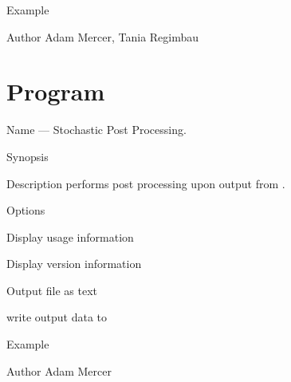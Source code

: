 \begin{entry}
\item[Example]

\item[Author] 
Adam Mercer, Tania Regimbau
\end{entry}
\clearpage

\clearpage
\section{Program }
\label{program:lalapps-stopp}

\begin{entry}
\item[Name]
 --- Stochastic Post Processing.

\item[Synopsis]
  \newline \hspace*{0.5in}
 \newline \hspace*{0.5in}
 \newline \hspace*{0.5in}
 \newline \hspace*{0.5in}
 

\item[Description]  performs post processing upon
output from .

\item[Options]\leavevmode
\begin{entry}
\item[\option{--help}]
Display usage information
\item[\option{--version}]
Display version information
\item[\option{--text}]
Output file as text
\item[\option{--output} \parm{FILE}]
write output data to 
\end{entry}

\item[Example]

\item[Author]
Adam Mercer
\end{entry}
